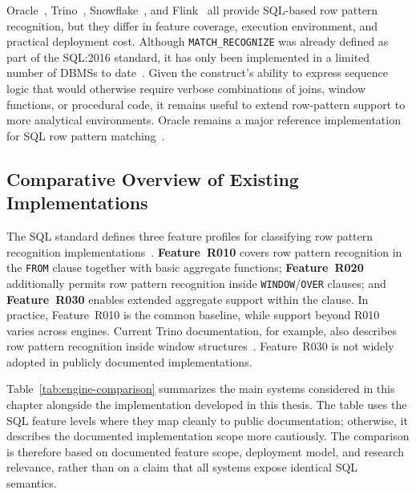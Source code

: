 Oracle~\cite{oracle2022,book}, Trino~\cite{trino2022,trino2021row},
Snowflake~\cite{snowflake2025match_recognize}, and
Flink~\cite{flink} all provide SQL-based row pattern recognition,
but they differ in feature coverage, execution environment, and
practical deployment cost.
Although \texttt{MATCH\_RECOGNIZE} was already defined as part of the
SQL:2016 standard, it has only been implemented in a limited number
of DBMSs to date~\cite{petkovic2022rpr}.
Given the construct's ability to express sequence logic that would
otherwise require verbose combinations of joins, window functions,
or procedural code, it remains useful to extend row-pattern support
to more analytical environments.
Oracle remains a major reference implementation for SQL row pattern
matching~\cite{oracle2022,oracle2021dwhsg,book}.

\subsection{Comparative Overview of Existing Implementations}
\label{subsec:related-existing-overview}

The SQL standard defines three feature profiles for classifying row
pattern recognition implementations~\cite{ISO2021,michels2018new}.
\textbf{Feature~R010} covers row pattern recognition in the
\texttt{FROM} clause together with basic aggregate functions;
\textbf{Feature~R020} additionally permits row pattern recognition
inside \texttt{WINDOW}/\texttt{OVER} clauses; and
\textbf{Feature~R030} enables extended aggregate support within the
clause.  In practice, Feature~R010 is the common baseline, while
support beyond R010 varies across engines.  Current Trino
documentation, for example, also describes row pattern recognition
inside window structures~\cite{trino2022}.  Feature~R030 is not
widely adopted in publicly documented implementations.

Table~\ref{tab:engine-comparison} summarizes the main systems
considered in this chapter alongside the implementation developed in
this thesis.  The table uses the SQL feature levels where they map
cleanly to public documentation; otherwise, it describes the
documented implementation scope more cautiously.  The comparison is
therefore based on documented feature scope, deployment model, and
research relevance, rather than on a claim that all systems expose
identical SQL semantics.

